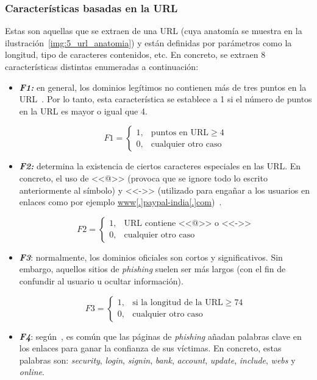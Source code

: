 \subsubsection{Características basadas en la URL}
Estas son aquellas que se extraen de una URL (cuya anatomía se muestra en la ilustración~\ref{img:5_url_anatomia}) y están definidas por parámetros como la longitud, tipo de caracteres contenidos, etc. En concreto, se extraen 8 características distintas enumeradas a continuación:

\begin{itemize}
	\item \textit{\textbf{F1:}} en general, los dominios legítimos no contienen más de tres puntos en la URL~\cite{featuresPhishing2018Gupta}. Por lo tanto, esta característica se establece a 1 si el número de puntos en la URL es mayor o igual que 4.
	
	\[F1 = \left\{ \begin{array}{lr} 1, & \text{puntos en URL} \ge 4\\ 
	0, & \text{cualquier otro caso} \label{eqn:phishing_f1} \end{array} \right. \] 
	
	\item \textit{\textbf{F2:}} determina la existencia de ciertos caracteres especiales en las URL. En concreto, el uso de <<@>> (provoca que se ignore todo lo escrito anteriormente al símbolo) y <<->> (utilizado para engañar a los usuarios en enlaces como por ejemplo \url{www[.]paypal-india[.]com})~\cite{featuresPhishing2018Gupta}.
	
	\[F2 = \left\{ \begin{array}{lr} 1, & \text{URL contiene <<@>> o <<->>}\\ 
	0, & \text{cualquier otro caso} \label{eqn:phishing_f2} \end{array} \right. \]
	
	\item \textit{\textbf{F3}}: normalmente, los dominios oficiales son cortos y significativos. Sin embargo, aquellos sitios de \textit{phishing} suelen ser más largos (con el fin de confundir al usuario u ocultar información).
	
	\[F3 = \left\{ \begin{array}{lr} 1, & \text{si la longitud de la URL} \ge 74\\ 
	0, & \text{cualquier otro caso} \label{eqn:phishing_f3} \end{array} \right. \]
	
	\item \textit{\textbf{F4}}: según~\cite{featuresPhishing2018Gupta}, es común que las páginas de \textit{phishing} añadan palabras clave en los enlaces para ganar la confianza de sus víctimas. En concreto, estas palabras son: \textit{security}, \textit{login}, \textit{signin}, \textit{bank}, \textit{account}, \textit{update}, \textit{include}, \textit{webs} y \textit{online}.
	

\end{itemize}
